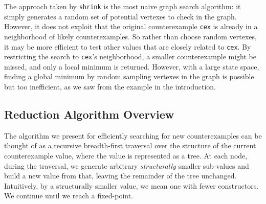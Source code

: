 \documentclass[10pt]{sigplanconf}
\newcommand{\ttp}[1]{\texttt{#1}}
\begin{document}
The approach taken by \ttp{shrink} is the most naive graph search algorithm:
it simply generates a random set of potential vertexes to check in the graph.
However, it does not exploit that the original counterexample \ttp{cex} is
already in a neighborhood of likely counterexamples.  So rather than choose
random vertexes, it may be more efficient to test other values that are closely
related to \ttp{cex}.  By restricting the search to \ttp{cex}'s neighborhood, a
smaller counterexample might be missed, and only a local minimum is returned.
However, with a large state space, finding a global minimum by random sampling
vertexes in the graph is possible but too inefficient, as we saw from the
example in the introduction.

\subsection{Reduction Algorithm Overview}
The algorithm we present for efficiently searching for new counterexamples can
be thought of as a recursive breadth-first traversal over the structure of the
current counterexample value, where the value is represented as a tree.  At each
node, during the traversal, we generate arbitrary \emph{structurally} smaller
sub-values and build a new value from that, leaving the remainder of the tree
unchanged.  Intuitively, by a structurally smaller value, we mean one with fewer
constructors.  We continue until we reach a fixed-point.
\end{document}
